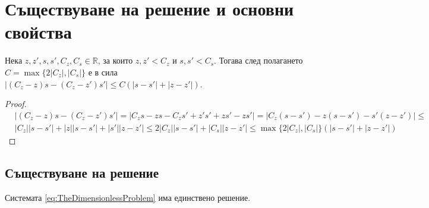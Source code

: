 \section{Съществуване на решение и основни свойства}
\begin{lemma}
  \label{lemma:Modulus}
  Нека $z, z', s, s', C_z, C_s \in \mathbb{R}$, за които $z, z' < C_z$ и $s, s' < C_s$. Тогава след полагането $C = \max\{2 |C_z|, |C_s|\}$ е в сила $|(C_z - z) s - (C_z - z') s'| \leq C (|s-s'| + |z - z'|)$.
\end{lemma}

\begin{proof}
  \begin{equation}
    \begin{split}
      &|(C_z - z) s - (C_z - z') s'| =
      |C_z s - z s - C_z s' + z' s' + z s' - z s'| =
      |C_z (s - s') - z (s - s') - s' (z - z')| \leq \\
      &|C_z| |s - s'| + |z| |s - s'| + |s'| |z - z'| \leq
      2 |C_z| |s - s'|  + |C_s| |z - z'| \leq
      \max\{2 |C_z|, |C_s|\} (|s-s'| + |z - z'|)
    \end{split}
    \end{equation}
    \end{proof}
\subsection{Съществуване на решение}
\begin{proposition}
  Системата \ref{eq:TheDimensionlessProblem} има единствено решение.
\end{proposition}

